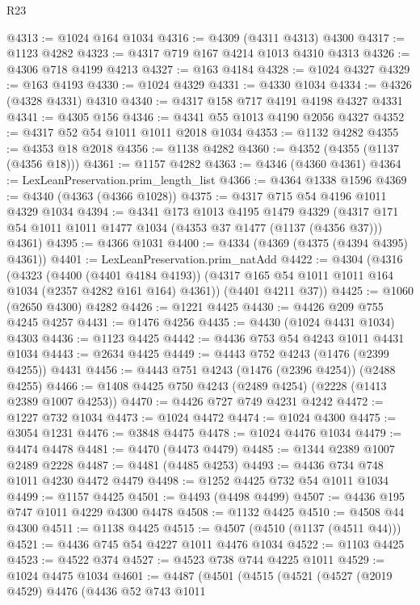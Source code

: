 \begin{lexlean}{R23}
\begin{coremodule}
@4313 := @1024 @164 @1034
@4316 := @4309 (@4311 @4313) @4300
@4317 := @1123 @4282
@4323 := @4317 @719 @167 @4214 @1013 @4310 @4313
@4326 := @4306 @718 @4199 @4213
@4327 := @163 @4184
@4328 := @1024 @4327
@4329 := @163 @4193
@4330 := @1024 @4329
@4331 := @4330 @1034
@4334 := @4326 (@4328 @4331) @4310
@4340 := @4317 @158 @717 @4191 @4198 @4327 @4331
@4341 := @4305 @156
@4346 := @4341 @55 @1013 @4190 @2056 @4327
@4352 := @4317 @52 @54 @1011 @1011 @2018 @1034
@4353 := @1132 @4282
@4355 := @4353 @18 @2018
@4356 := @1138 @4282
@4360 := @4352 (@4355 (@1137 (@4356 @18)))
@4361 := @1157 @4282
@4363 := @4346 (@4360 @4361)
@4364 := LexLeanPreservation.prim_length_list
@4366 := @4364 @1338 @1596
@4369 := @4340 (@4363 (@4366 @1028))
@4375 := @4317 @715 @54 @4196 @1011 @4329 @1034
@4394 := @4341
    @173
    @1013
    @4195
    @1479
    @4329
    (@4317 @171 @54 @1011 @1011 @1477 @1034 (@4353 @37 @1477 (@1137 (@4356 @37))) @4361)
@4395 := @4366 @1031
@4400 := @4334 (@4369 (@4375 (@4394 @4395) @4361))
@4401 := LexLeanPreservation.prim_natAdd
@4422 := @4304
    (@4316
      (@4323
        (@4400 (@4401 @4184 @4193))
        (@4317 @165 @54 @1011 @1011 @164 @1034 (@2357 @4282 @161 @164) @4361))
      (@4401 @4211 @37))
@4425 := @1060 (@2650 @4300) @4282
@4426 := @1221 @4425
@4430 := @4426 @209 @755 @4245 @4257
@4431 := @1476 @4256
@4435 := @4430 (@1024 @4431 @1034) @4303
@4436 := @1123 @4425
@4442 := @4436 @753 @54 @4243 @1011 @4431 @1034
@4443 := @2634 @4425
@4449 := @4443 @752 @4243 (@1476 (@2399 @4255)) @4431
@4456 := @4443 @751 @4243 (@1476 (@2396 @4254)) (@2488 @4255)
@4466 := @1408 @4425 @750 @4243 (@2489 @4254) (@2228 (@1413 @2389 @1007 @4253))
@4470 := @4426 @727 @749 @4231 @4242
@4472 := @1227 @732 @1034
@4473 := @1024 @4472
@4474 := @1024 @4300
@4475 := @3054 @1231
@4476 := @3848 @4475
@4478 := @1024 @4476 @1034
@4479 := @4474 @4478
@4481 := @4470 (@4473 @4479)
@4485 := @1344 @2389 @1007 @2489 @2228
@4487 := @4481 (@4485 @4253)
@4493 := @4436 @734 @748 @1011 @4230 @4472 @4479
@4498 := @1252 @4425 @732 @54 @1011 @1034
@4499 := @1157 @4425
@4501 := @4493 (@4498 @4499)
@4507 := @4436 @195 @747 @1011 @4229 @4300 @4478
@4508 := @1132 @4425
@4510 := @4508 @44 @4300
@4511 := @1138 @4425
@4515 := @4507 (@4510 (@1137 (@4511 @44)))
@4521 := @4436 @745 @54 @4227 @1011 @4476 @1034
@4522 := @1103 @4425
@4523 := @4522 @374
@4527 := @4523 @738 @744 @4225 @1011
@4529 := @1024 @4475 @1034
@4601 := @4487
    (@4501
      (@4515
        (@4521
          (@4527
            (@2019 @4529)
            @4476
            (@4436
              @52
              @743
              @1011

\end{coremodule}
\end{lexlean}
